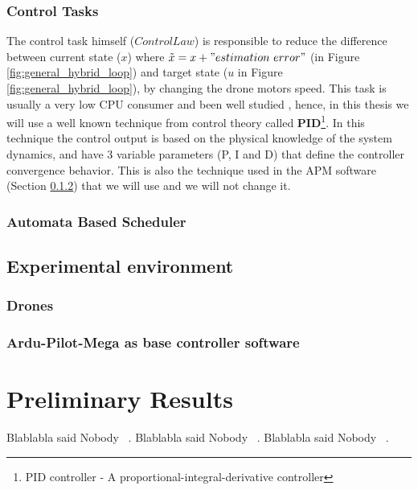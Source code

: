 \documentclass[11pt]{article}
\begin{document}
\subsubsection{Control Tasks}
The control task himself ($Control Law$) is responsible to reduce the difference between current state ($x$) where $\tilde{x} = x+ "estimation~error"$ (in Figure \ref{fig:general_hybrid_loop}) and target state ($u$ in Figure \ref{fig:general_hybrid_loop}), by changing the drone motors speed.
This task is usually a very low CPU consumer and been well studied \cite{?? PID}, hence, in this thesis we will use a well known technique from control theory called {\textbf{PID}\footnote{PID controller - A proportional-integral-derivative controller}}. 
In this technique the control output is based on the physical knowledge of the system dynamics, and have 3 variable parameters (P, I and D) that define the controller convergence behavior. 
This is also the technique used in the APM software (Section \ref{sec:APM}) that we will use and we will not change it.

\subsubsection{Automata Based Scheduler}


\subsection{Experimental environment}
\subsubsection{Drones}
\subsubsection{Ardu-Pilot-Mega as base controller software}
\label{sec:APM}

\section{Preliminary Results}
Blablabla said Nobody ~\cite{Merav}.
Blablabla said Nobody ~\cite{APM}.
Blablabla said Nobody ~\cite{RTComposer}.



    
    {}
\end{document}
